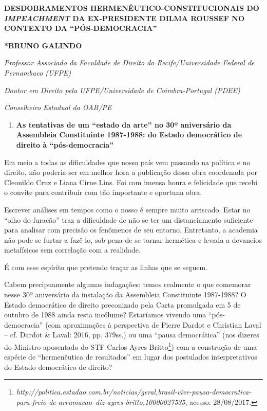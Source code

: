 \textbf{DESDOBRAMENTOS HERMENÊUTICO-CONSTITUCIONAIS DO
\emph{IMPEACHMENT} DA EX-PRESIDENTE DILMA ROUSSEF NO CONTEXTO DA
``PÓS-DEMOCRACIA''}

\textbf{*BRUNO GALINDO}

\emph{Professor Associado da Faculdade de Direito do Recife/Universidade
Federal de Pernambuco (UFPE)}

\emph{Doutor em Direito pela UFPE/Universidade de Coimbra-Portugal
(PDEE)}

\emph{Conselheiro Estadual da OAB/PE}

\begin{enumerate}
\def\labelenumi{\arabic{enumi}.}
\item
  \textbf{As tentativas de um ``estado da arte'' no 30º aniversário da
  Assembleia Constituinte 1987-1988: do Estado democrático de direito à
  ``pós-democracia''}
\end{enumerate}

Em meio a todas as dificuldades que nosso país vem passando na política
e no direito, não poderia ser em melhor hora a publicação dessa obra
coordenada por Cleonildo Cruz e Liana Cirne Lins. Foi com imensa honra e
felicidade que recebi o convite para contribuir com tão importante e
oportuna obra.

Escrever análises em tempos como o nosso é sempre muito arriscado. Estar
no ``olho do furacão'' traz a dificuldade de não se ter um
distanciamento suficiente para analisar com precisão os fenômenos de seu
entorno. Entretanto, a academia não pode se furtar a fazê-lo, sob pena
de se tornar hermética e levada a devaneios metafísicos sem correlação
com a realidade.

É com esse espírito que pretendo traçar as linhas que se seguem.

Cabem precipuamente algumas indagações: temos realmente o que comemorar
nesse 30º aniversário da instalação da Assembleia Constituinte
1987-1988? O Estado democrático de direito preconizado pela Carta
promulgada em 5 de outubro de 1988 ainda resta incólume? Estaríamos
vivendo uma ``pós-democracia'' (com aproximações à perspectiva de Pierre
Dardot e Christian Laval -- cf. Dardot \& Laval: 2016, pp. 379ss.) ou
uma ``pausa democrática'' (nos dizeres do Ministro aposentado do STF
Carlos Ayres Britto\footnote{\emph{http://politica.estadao.com.br/noticias/geral,brasil-vive-pausa-democratica-para-freio-de-arrumacao--diz-ayres-britto,10000027535},
  acesso: 28/08/2017.}) com a construção de uma espécie de
``hermenêutica de resultados'' em lugar dos postulados interpretativos
do Estado democrático de direito?

